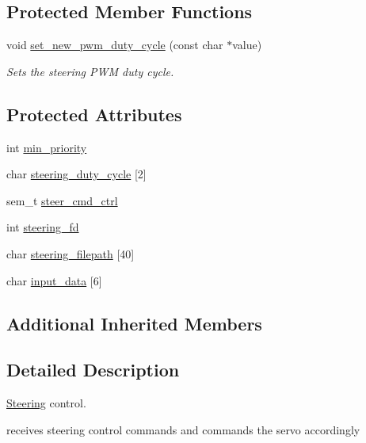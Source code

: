 \subsection*{Protected Member Functions}
\begin{DoxyCompactItemize}
\item 
void \hyperlink{classSteering_aa0f0e87b925f860575429668a9a84e8d}{set\-\_\-new\-\_\-pwm\-\_\-duty\-\_\-cycle} (const char $\ast$value)
\begin{DoxyCompactList}\small\item\em Sets the steering P\-W\-M duty cycle. \end{DoxyCompactList}\end{DoxyCompactItemize}
\subsection*{Protected Attributes}
\begin{DoxyCompactItemize}
\item 
int \hyperlink{classSteering_ab31761e4665bf81e580f1bc32c9fff79}{min\-\_\-priority}
\item 
char \hyperlink{classSteering_a3eb0bda8706c97d35c0ae31daeefa5a1}{steering\-\_\-duty\-\_\-cycle} \mbox{[}2\mbox{]}
\item 
sem\-\_\-t \hyperlink{classSteering_af9a4f30e9dc0dc37b31a421cb88ca8ba}{steer\-\_\-cmd\-\_\-ctrl}
\item 
int \hyperlink{classSteering_ae85b07902746525a57bf049d872b4f26}{steering\-\_\-fd}
\item 
char \hyperlink{classSteering_adfe05011b3442b1b24cd9dfc1e24ad70}{steering\-\_\-filepath} \mbox{[}40\mbox{]}
\item 
char \hyperlink{classSteering_a8372fdfcf95f814d8e6a77f10b1116fe}{input\-\_\-data} \mbox{[}6\mbox{]}
\end{DoxyCompactItemize}
\subsection*{Additional Inherited Members}


\subsection{Detailed Description}
\hyperlink{classSteering}{Steering} control. 

receives steering control commands and commands the servo accordingly 

